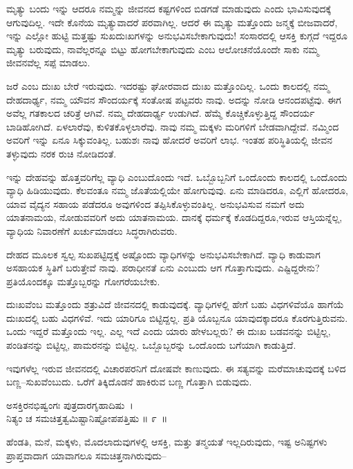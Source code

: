 ಮೃತ್ಯು ಬಂದು ಇನ್ನು ಆದರೂ ನಮ್ಮನ್ನು ಜೀವನದ ಕಷ್ಟಗಳಿಂದ ಬಿಡಗಡೆ ಮಾಡುವುದು ಎಂದು ಭಾವಿಸುವುದಕ್ಕೆ ಆಗುವುದಿಲ್ಲ. ಇದೇ ಕೊನೆಯ ಮೃತ್ಯುವಾದರೆ ಪರವಾಗಿಲ್ಲ. ಆದರೆ ಈ ಮೃತ್ಯು ಮತ್ತೊಂದು ಜನ್ಮಕ್ಕೆ ಬೀಜವಾದರೆ, ಇನ್ನು ಎಲ್ಲೋ ಹುಟ್ಟಿ ಮತ್ತಷ್ಟು ಸುಖದುಃಖಗಳನ್ನು ಅನುಭವಿಸಬೇಕಾಗುವುದು! ಸಂಸಾರದಲ್ಲಿ ಆಸಕ್ತಿ ಕುಗ್ಗದೆ ಇದ್ದರೂ ಮೃತ್ಯು ಬರುವುದು, ನಾವೆಲ್ಲರನ್ನೂ ಬಿಟ್ಟು ಹೋಗಬೇಕಾಗುವುದು ಎಂಬ ಆಲೋಚನೆಯೊಂದೇ ಸಾಕು ನಮ್ಮ ಜೀವನವೆಲ್ಲ ಸಪ್ಪೆ ಮಾಡಲು.

ಜರೆ ಎಂಬ ದುಃಖ ಬೇರೆ ಇರುವುದು. ಇದರಷ್ಟು ಘೋರವಾದ ದುಃಖ ಮತ್ತೊಂದಿಲ್ಲ. ಒಂದು ಕಾಲದಲ್ಲಿ ನಮ್ಮ ದೇಹದಾರ್ಢ್ಯ, ನಮ್ಮ ಯೌವನ ಸೌಂದರ್ಯಕ್ಕೆ ಸಂತೋಷ ಪಟ್ಟವರು ನಾವು. ಅದನ್ನು ನೋಡಿ ಆನಂದಪಟ್ಟೆವು. ಈಗ ಅವೆಲ್ಲ ಗತಕಾಲದ ಚರಿತ್ರೆ ಆಗಿವೆ. ನಮ್ಮ ದೇಹದಾರ್ಢ್ಯ ಉಡುಗಿದೆ. ಹೆಮ್ಮೆ ಕೊಚ್ಚಿಕೊಳ್ಳುತ್ತಿದ್ದ ಸೌಂದರ್ಯ ಬಾಡಿಹೋಗಿದೆ. ಏಳಲಾರೆವು, ಕುಳಿತಕೊಳ್ಳಲಾರೆವು. ನಾವು ನಮ್ಮ ಮಕ್ಕಳು ಮರಿಗಳಿಗೆ ಬೇಡವಾಗಿದ್ದೇವೆ. ನಮ್ಮಿಂದ ಅವರಿಗೆ ಇನ್ನು ಏನೂ ಸಿಕ್ಕುವಂತಿಲ್ಲ. ಬಹುಶಃ ನಾವು ಹೋದರೆ ಅವರಿಗೆ ಲಾಭ. ಇಂತಹ ಪರಿಸ್ಥಿತಿಯಲ್ಲಿ ಜೀವನ ತಳ್ಳುವುದು ನರಕ ರುಚಿ ನೋಡಿದಂತೆ.

\newpage

ಇನ್ನು ದೇಹವನ್ನು ಹೊತ್ತವರಿಗೆಲ್ಲ ವ್ಯಾಧಿ ಎಂಬುದೊಂದು ಇದೆ. ಒಬ್ಬೊಬ್ಬನಿಗೆ ಒಂದೊಂದು ಕಾಲದಲ್ಲಿ ಒಂದೊಂದು ವ್ಯಾಧಿ ಹಿಡಿಯುವುದು. ಕೆಲವಂತೂ ನಮ್ಮ ಜೊತೆಯಲ್ಲಿಯೇ ಹೋಗು\-ವುವು. ಏನು ಮಾಡಿದರೂ, ಎಲ್ಲಿಗೆ ಹೋದರೂ, ಯಾವ ವೈದ್ಯನ ಸಹಾಯ ಪಡೆದರೂ ಅವುಗಳಿಂದ ತಪ್ಪಿಸಿಕೊಳ್ಳುವಂತಿಲ್ಲ. ಅನುಭವಿಸುವ ನಮಗೆ ಅದು ಯಾತನಾಮಯ, ನೋಡುವವರಿಗೆ ಅದು ಯಾತನಾಮಯ. ದಾನಕ್ಕೆ ಧರ್ಮಕ್ಕೆ ಕೊಡದಿದ್ದರೂ,ಇರುವ ಆಸ್ತಿಯನ್ನೆಲ್ಲ, ವ್ಯಾಧಿಯ ನಿವಾರಣೆಗೆ ಖರ್ಚುಮಾಡಲು ಸಿದ್ಧರಾಗಿರುವರು.

ದೇಹದ ಮೂಲಕ ಸ್ವಲ್ಪ ಸುಖಪಟ್ಟಿದ್ದಕ್ಕೆ ಅಷ್ಟೊಂದು ವ್ಯಾಧಿಗಳನ್ನು ಅನುಭವಿಸಬೇಕಾಗಿದೆ. ವ್ಯಾಧಿ ಕಾಡುವಾಗ ಅಸಹಾಯಕ ಸ್ಥಿತಿಗೆ ಬರುತ್ತೇವೆ ನಾವು. ಪರಾಧೀನತೆ ಏನು ಎಂಬುದು ಆಗ ಗೊತ್ತಾಗುವುದು. ಎಷ್ಟಿದ್ದರೇನು? ಪ್ರತಿಯೊಂದಕ್ಕೂ ಮತ್ತೊಬ್ಬರನ್ನು ಗೋಗರೆಯಬೇಕು.

ದುಃಖವೆಂಬ ಮತ್ತೊಂದು ಶತ್ರುವಿದೆ ಜೀವನದಲ್ಲಿ ಕಾಡುವುದಕ್ಕೆ. ವ್ಯಾಧಿಗಳಲ್ಲಿ ಹೇಗೆ ಬಹು ವಿಧಗಳಿವೆಯೊ ಹಾಗೆಯೆ ದುಃಖದಲ್ಲಿ ಬಹು ವಿಧಗಳಿವೆ. ಇದು ಯಾರಿಗೂ ಬಿಟ್ಟಿದ್ದಲ್ಲ. ಪ್ರತಿ ಯೊಬ್ಬನೂ ಯಾವುದಕ್ಕಾದರೂ ಕೊರಗುತ್ತಿರುವನು. ಒಂದು ಇದ್ದರೆ ಮತ್ತೊಂದು ಇಲ್ಲ. ಎಲ್ಲ ಇದೆ ಎಂದು ಯಾರು ಹೇಳಬಲ್ಲರು? ಈ ದುಃಖ ಬಡವನನ್ನು ಬಿಟ್ಟಿಲ್ಲ, ಪಂಡಿತನನ್ನು ಬಿಟ್ಟಿಲ್ಲ, ಪಾಮರನನ್ನು ಬಿಟ್ಟಿಲ್ಲ. ಒಬ್ಬೊಬ್ಬರನ್ನು ಒಂದೊಂದು ಬಗೆಯಾಗಿ ಕಾಡುತ್ತಿದೆ.

ಇವುಗಳೆಲ್ಲ ಇರುವ ಜೀವನದಲ್ಲಿ ವಿಚಾರಪರನಿಗೆ ದೋಷವೇ ಕಾಣುವುದು. ಈ ಸತ್ಯವನ್ನು ಮರೆಮಾಚುವುದಕ್ಕೆ ಬಳಿದ ಬಣ್ಣ–ಸುಖವೆಂಬುದು. ಒರೆಗೆ ತಿಕ್ಕಿದೊಡನೆ ಹಾಕಿರುವ ಬಣ್ಣ ಗೊತ್ತಾಗಿ ಬಿಡುವುದು.

\begin{shloka}
ಅಸಕ್ತಿರನಭಿಷ್ವಂಗಃ ಪುತ್ರದಾರಗೃಹಾದಿಷು~।\\ನಿತ್ಯಂ ಚ ಸಮಚಿತ್ತತ್ವಮಿಷ್ಟಾನಿಷ್ಟೋಪಪತ್ತಿಷು \hfill॥ ೯~॥
\end{shloka}

\begin{artha}
ಹೆಂಡತಿ, ಮನೆ, ಮಕ್ಕಳು, ಮೊದಲಾದುವುಗಳಲ್ಲಿ ಆಸಕ್ತಿ, ಮತ್ತು ತನ್ಮಯತೆ ಇಲ್ಲದಿರುವುದು, ಇಷ್ಟ ಅನಿಷ್ಟಗಳು ಪ್ರಾಪ್ತವಾದಾಗ ಯಾವಾಗಲೂ ಸಮಚಿತ್ತನಾಗಿರುವುದು–
\end{artha}

